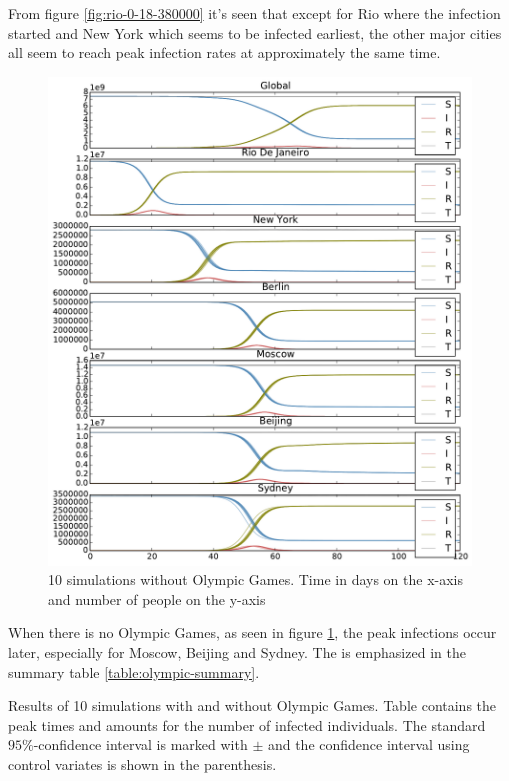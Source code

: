 From figure \ref{fig:rio-0-18-380000} it's seen that except for Rio where the infection started and New York which seems to be infected earliest, the other major cities all seem to reach peak infection rates at approximately the same time. 

\begin{figure}[H]
	\centering
	\includegraphics[width=1.0 \linewidth]{plots/no_rio.pdf}
	\caption{10 simulations without Olympic Games. Time in days on the x-axis and number of people on the y-axis}
	\label{fig:no_rio}
\end{figure}

When there is no Olympic Games, as seen in figure \ref{fig:no_rio}, the peak infections occur later, especially for Moscow, Beijing and Sydney. The is emphasized in the summary table \ref{table:olympic-summary}.

\begin{table}[H]
	\centering
	
	\caption{Results of 10 simulations with and without Olympic Games. Table contains the peak times and amounts for the number of infected individuals. The standard $95\%$-confidence interval is marked with $\pm$ and the confidence interval using control variates is shown in the parenthesis.}
	\label{table:olympic-summary}
\end{table}

